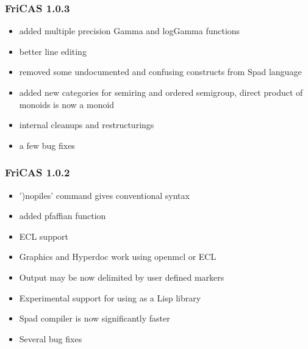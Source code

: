 \subsubsection{FriCAS 1.0.3}

\begin{itemize}
\item added multiple precision Gamma and logGamma functions

\item better line editing

\item removed some undocumented and confusing constructs from Spad
  language

\item added new categories for semiring and ordered semigroup, direct
  product of monoids is now a monoid

\item internal cleanups and restructurings

\item a few bug fixes
\end{itemize}

\subsubsection{FriCAS 1.0.2}

\begin{itemize}
\item ')nopiles' command gives conventional syntax

\item added pfaffian function

\item ECL support

\item Graphics and Hyperdoc work using openmcl or ECL

\item Output may be now delimited by user defined markers

\item Experimental support for using as a Lisp library

\item Spad compiler is now significantly faster

\item Several bug fixes
\end{itemize}

